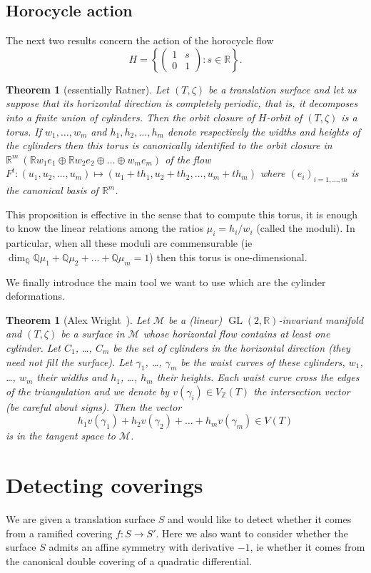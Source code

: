 \documentclass[a4paper,12pt]{article}
\def\bR{\mathbb{R}}
\def\bQ{\mathbb{Q}}
\def\bZ{\mathbb{Z}}
\def\cM{\mathcal{M}}
\def\GL{\operatorname{GL}}
\newtheorem{theorem}[definition]{Theorem}
\begin{document}
\subsection{Horocycle action}
The next two results concern the action of the horocycle flow
\[
H = \left\{\begin{pmatrix}
1 & s \\
0 & 1
\end{pmatrix}: s \in \bR \right\}.
\]
\begin{theorem}[essentially Ratner]
Let $(T, \zeta)$ be a translation surface and let us suppose that its
horizontal direction is completely periodic, that is, it decomposes into
a finite union of cylinders. Then the orbit closure of $H$-orbit of
$(T,\zeta)$ is a torus. If $w_1, \ldots, w_m$ and
$h_1, h_2, \ldots, h_m$ denote respectively the widths and heights of
the cylinders then this torus is canonically identified to the orbit
closure in $\bR^m \ (\bR w_1 e_1 \oplus \bR w_2 e_2 \oplus \ldots \oplus w_m e_m)$
of the flow $F^t: (u_1, u_2, \ldots, u_m) \mapsto (u_1 + t h_1, u_2 + t h_2, \ldots, u_m + t h_m)$
where $(e_i)_{i=1,\ldots,m}$ is the canonical basis of $\bR^m$.
\end{theorem}
This proposition is effective in the sense that to compute this torus, it is
enough to know the linear relations among the ratios $\mu_i = h_i / w_i$
(called the moduli). In particular, when all these moduli are commensurable
(ie $\dim_\bQ \bQ \mu_1 + \bQ \mu_2 + \ldots + \bQ \mu_m = 1$) then this
torus is one-dimensional.

We finally introduce the main tool we want to use which are the cylinder deformations.
\begin{theorem}[Alex Wright~\cite{Wright-cylinder-deformations}]
Let $\cM$ be a (linear) $\GL(2,\bR)$-invariant manifold and $(T,\zeta)$ be a surface
in $\cM$ whose horizontal flow contains at least one cylinder. Let $C_1$, \ldots, $C_m$
be the set of cylinders in the horizontal direction (they need not fill the surface).
Let $\gamma_1$, \ldots, $\gamma_m$ be the waist curves of these cylinders, $w_1$, \ldots, $w_m$
their widths and $h_1$, \ldots, $h_m$ their heights.
Each waist curve cross the edges of the triangulation and we denote by $v(\gamma_i) \in V_\bZ(T)$ the
intersection vector (be careful about signs). Then the vector
\[
h_1 v(\gamma_1) + h_2 v(\gamma_2) + \ldots + h_m v(\gamma_m) \in V(T)
\]
is in the tangent space to $\cM$.
\end{theorem}

\section{Detecting coverings}
We are given a translation surface $S$ and would like to detect whether it comes from a ramified
covering $f: S \to S'$. Here we also want to consider whether the surface $S$
admits an affine symmetry with derivative $-1$, ie whether it comes from the
canonical double covering of a quadratic differential.
\end{document}
